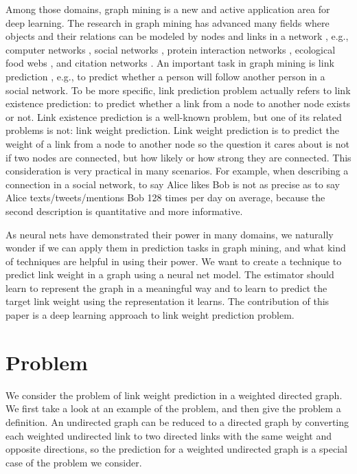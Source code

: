\documentclass[conference]{IEEEtran}
\begin{document}
Among those domains,
graph mining is a new and active application area for deep learning.
The research in graph mining has advanced many fields
where objects and their relations can be modeled by nodes and links in a network \cite{chakrabarti2006graph}, e.g.,
computer networks \cite{bermond1995distributed},
social networks \cite{cook2006mining},
protein interaction networks \cite{bader2003automated},
ecological food webs \cite{brown2003ecological},
and citation networks \cite{greenberg2009citation}.
An important task in graph mining is link prediction \cite{liben2007link},
e.g., to predict whether a person will follow another person in a social network.
To be more specific,
link prediction problem actually refers to link existence prediction:
to predict whether a link from a node to another node exists or not.
Link existence prediction is a well-known problem,
but one of its related problems is not: link weight prediction.
Link weight prediction is
to predict the weight of a link from a node to another node
so the question it cares about is not if two nodes are connected,
but how likely or how strong they are connected.
This consideration is very practical in many scenarios.
For example, when describing a connection in a social network,
to say Alice likes Bob is not as precise as
to say Alice texts/tweets/mentions Bob 128 times per day on average,
because the second description is quantitative and more informative.

As neural nets have demonstrated their power in many domains,
we naturally wonder if we can apply them in prediction tasks in graph mining,
and what kind of techniques are helpful in using their power.
We want to create a technique to predict link weight in a graph using a 
neural net model.
The estimator should learn to represent the graph in a meaningful way and to 
learn to predict the target link weight using the representation it learns.
The contribution of this paper is
a deep learning approach to link weight prediction problem.

\section{Problem}
We consider the problem of link weight prediction in a weighted directed graph.
We first take a look at an example of the problem,
and then give the problem a definition.
An undirected graph can be reduced to a directed graph by converting each weighted undirected link to two directed links with the same weight and opposite directions,
so the prediction for a weighted undirected graph is a special case of the problem we consider.
\end{document}
